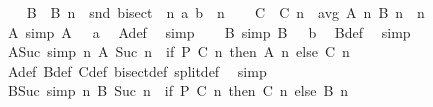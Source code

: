 \begin{isabellebody}
\ \ \isamarkupfalse%
\ B\ \ {\isachardoublequoteopen}B\ n\ {\isacharequal}{\kern0pt}\ snd\ {\isacharparenleft}{\kern0pt}{\isacharparenleft}{\kern0pt}bisect\ {\isacharcircum}{\kern0pt}{\isacharcircum}{\kern0pt}\ n{\isacharparenright}{\kern0pt}\ {\isacharparenleft}{\kern0pt}a{\isacharcomma}{\kern0pt}\ b{\isacharparenright}{\kern0pt}{\isacharparenright}{\kern0pt}{\isachardoublequoteclose}\ \ n\isanewline
\ \ \isamarkupfalse%
\ C\ \ {\isachardoublequoteopen}C\ n\ {\isacharequal}{\kern0pt}\ avg\ {\isacharparenleft}{\kern0pt}A\ n{\isacharparenright}{\kern0pt}\ {\isacharparenleft}{\kern0pt}B\ n{\isacharparenright}{\kern0pt}{\isachardoublequoteclose}\ \ n\isanewline
\ \ \isamarkupfalse%
\ A{\isacharunderscore}{\kern0pt}{}\ {\isacharbrackleft}{\kern0pt}simp{\isacharbrackright}{\kern0pt}{\isacharcolon}{\kern0pt}\ {\isachardoublequoteopen}A\ {}\ {\isacharequal}{\kern0pt}\ a{\isachardoublequoteclose}\ \isamarkupfalse%
\ A{\isacharunderscore}{\kern0pt}def\ \isamarkupfalse%
\ simp\isanewline
\ \ \isamarkupfalse%
\ B{\isacharunderscore}{\kern0pt}{}\ {\isacharbrackleft}{\kern0pt}simp{\isacharbrackright}{\kern0pt}{\isacharcolon}{\kern0pt}\ {\isachardoublequoteopen}B\ {}\ {\isacharequal}{\kern0pt}\ b{\isachardoublequoteclose}\ \isamarkupfalse%
\ B{\isacharunderscore}{\kern0pt}def\ \isamarkupfalse%
\ simp\isanewline
\ \ \isamarkupfalse%
\ A{\isacharunderscore}{\kern0pt}Suc\ {\isacharbrackleft}{\kern0pt}simp{\isacharbrackright}{\kern0pt}{\isacharcolon}{\kern0pt}\ {\isachardoublequoteopen}{\isasymAnd}n{\isachardot}{\kern0pt}\ A\ {\isacharparenleft}{\kern0pt}Suc\ n{\isacharparenright}{\kern0pt}\ {\isacharequal}{\kern0pt}\ {\isacharparenleft}{\kern0pt}if\ P\ {\isacharparenleft}{\kern0pt}C\ n{\isacharparenright}{\kern0pt}\ then\ A\ n\ else\ C\ n{\isacharparenright}{\kern0pt}{\isachardoublequoteclose}\isanewline
\ \ \ \ \isamarkupfalse%
\ A{\isacharunderscore}{\kern0pt}def\ B{\isacharunderscore}{\kern0pt}def\ C{\isacharunderscore}{\kern0pt}def\ bisect{\isacharunderscore}{\kern0pt}def\ split{\isacharunderscore}{\kern0pt}def\ \isamarkupfalse%
\ simp\isanewline
\ \ \isamarkupfalse%
\ B{\isacharunderscore}{\kern0pt}Suc\ {\isacharbrackleft}{\kern0pt}simp{\isacharbrackright}{\kern0pt}{\isacharcolon}{\kern0pt}\ {\isachardoublequoteopen}{\isasymAnd}n{\isachardot}{\kern0pt}\ B\ {\isacharparenleft}{\kern0pt}Suc\ n{\isacharparenright}{\kern0pt}\ {\isacharequal}{\kern0pt}\ {\isacharparenleft}{\kern0pt}if\ P\ {\isacharparenleft}{\kern0pt}C\ n{\isacharparenright}{\kern0pt}\ then\ C\ n\ else\ B\ n{\isacharparenright}{\kern0pt}{\isachardoublequoteclose}\isanewline

\end{isabellebody}
